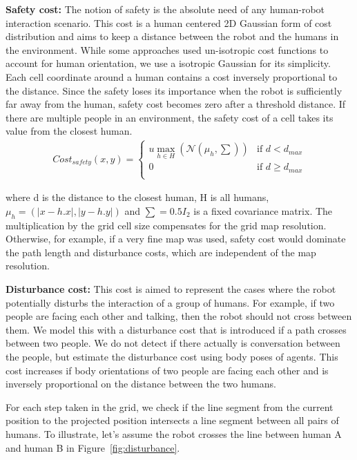 \textbf{Safety cost:} The notion of safety is the absolute need of any human-robot interaction scenario. This cost is a human centered 2D Gaussian form of cost distribution and aims to keep a distance between the robot and the humans in the environment. While some approaches used un-isotropic cost functions to account for human orientation, we use a isotropic Gaussian for its simplicity. Each cell coordinate around a human contains a cost inversely proportional to the distance. Since the safety loses its importance when the robot is sufficiently far away from the human, safety cost becomes zero after a threshold distance. If there are multiple people in an environment, the safety cost of a cell takes its value from the closest human.
\begin{align}
Cost_{safety}(x,y)=\left\{ \begin{array}{cl}
u\max_{h\in H}(\mathcal{N}(\mu_h,\sum)) & \textrm{if $d<d_{max}$}\\
0 & \textrm{if $d\geq d_{max}$}\\
\end{array}\right.
\end{align}

where d is the distance to the closest human, H is all humans, $\mu_h = (|x - h.x|,|y - h.y|)$ and $\sum = 0.5I_2$ is a fixed covariance matrix. The multiplication by the grid cell size compensates for the grid map resolution. Otherwise, for example, if a very fine map was used, safety cost would dominate the path length and disturbance costs, which are independent of the map resolution.
 
\textbf{Disturbance cost:} This cost is aimed to represent the cases where the robot potentially disturbs the interaction of a group of humans. For example, if two people are facing each other and talking, then the robot should not cross between them.  We model this with a disturbance cost that is introduced if a path crosses between two people. We do not detect if there actually is conversation between the people, but estimate the disturbance cost using body poses of agents. This cost increases if body orientations of two people are facing each other and is inversely proportional on the distance between the two humans.

For each step taken in the grid, we check if the line segment from the current position to the  projected position intersects a line segment between all pairs of humans. To illustrate, let's assume the robot crosses the line between human A and human B in Figure~\ref{fig:disturbance}. 

